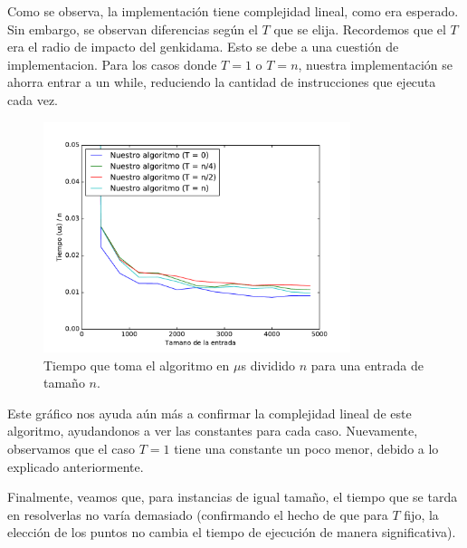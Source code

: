 Como se observa, la implementación tiene complejidad lineal, como era esperado. Sin embargo, se observan diferencias según el $T$ que se elija. Recordemos que el $T$ era el radio de impacto del genkidama. Esto se debe a una cuestión de implementacion. Para los casos donde $T = 1$ o $T = n$, nuestra implementación se ahorra entrar a un while, reduciendo la cantidad de instrucciones que ejecuta cada vez.

\begin{figure}[H]
 \centering
	\includegraphics[width=0.8\textwidth]{img/tiempos/genkidama2.pdf}
	\caption{\footnotesize Tiempo que toma el algoritmo en $\mu$s dividido $n$ para una entrada de tamaño $n$.}
	\label{fig:genkidama-tiempos2}
\end{figure}

Este gráfico nos ayuda aún más a confirmar la complejidad lineal de este algoritmo, ayudandonos a ver las constantes para cada caso. Nuevamente, observamos que el caso $T = 1$ tiene una constante un poco menor, debido a lo explicado anteriormente.

Finalmente, veamos que, para instancias de igual tamaño, el tiempo que se tarda en resolverlas no varía demasiado (confirmando el hecho de que para $T$ fijo, la elección de los puntos no cambia el tiempo de ejecución de manera significativa).

